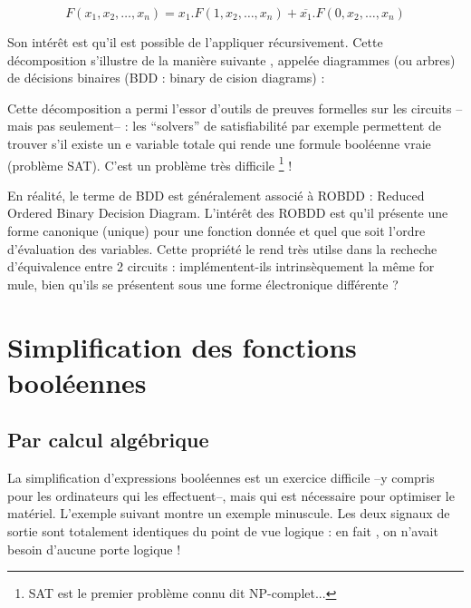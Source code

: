 $$F(x_1,x_2,\dots,x_n)=x_1.F(1,x_2,\dots,x_n) + \overline{x_1}.F(0,x_2,\dots,x_n)$$


Son intérêt est qu'il est possible de l'appliquer récursivement. Cette décomposition s'illustre de la manière suivante , appelée diagrammes (ou arbres) de décisions binaires (BDD : binary de
cision diagrams) :


Cette décomposition a permi l'essor d'outils de preuves formelles sur les circuits --mais pas seulement-- : les ``solvers'' de satisfiabilité par exemple permettent de trouver s'il existe un
e variable totale qui rende une formule booléenne vraie (problème SAT). C'est un problème très difficile \footnote{SAT est le premier problème connu dit NP-complet...} !

En réalité, le terme de BDD est généralement associé à ROBDD : Reduced Ordered Binary Decision Diagram. L'intérêt des ROBDD est qu'il présente une forme canonique (unique) pour une fonction
donnée et quel que soit l'ordre d'évaluation des variables. Cette propriété le rend très utilse dans la recheche d'équivalence entre 2 circuits : implémentent-ils intrinsèquement la même for
mule, bien qu'ils se présentent sous une forme électronique différente ?


\section{Simplification des fonctions booléennes}

\subsection{Par calcul algébrique}

La simplification d'expressions booléennes est un exercice difficile --y compris pour les ordinateurs qui les effectuent--, mais qui est nécessaire pour
optimiser le matériel. L'exemple suivant montre un exemple minuscule. Les deux signaux de sortie sont totalement identiques du point de vue logique : en fait
, on n'avait besoin d'aucune porte logique !

